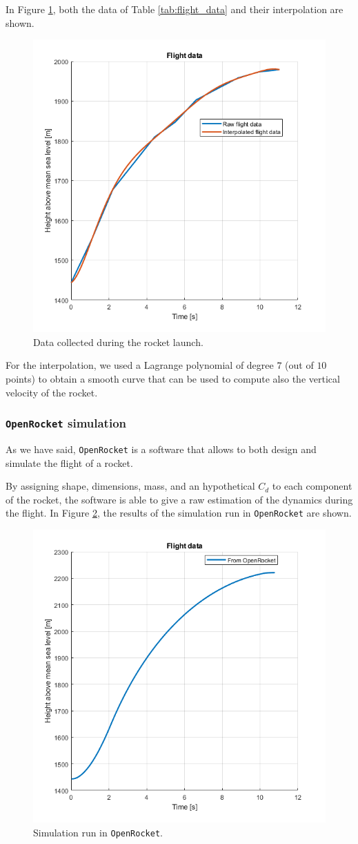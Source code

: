 In Figure \ref{fig:flight_data}, both the data of Table \ref{tab:flight_data} and their interpolation are shown.

\begin{figure}[H]
    \centering
    \includegraphics[width=.5\textwidth]{img/Validation/FlightData.png}
    \caption{Data collected during the rocket launch.}
    \label{fig:flight_data}
\end{figure}

For the interpolation, we used a Lagrange polynomial of degree $7$ (out of $10$ points) to obtain a smooth curve that can be used to compute also the vertical velocity of the rocket.


\subsubsection{\texttt{OpenRocket} simulation}
\label{subsubsec:openrocket_simulation}

As we have said, \texttt{OpenRocket} is a software that allows to both design and simulate the flight of a rocket.

By assigning shape, dimensions, mass, and an hypothetical $C_d$ to each component of the rocket, the software is able to give a raw estimation of the dynamics during the flight.
In Figure \ref{fig:openrocket_simulation}, the results of the simulation run in \texttt{OpenRocket} are shown.

\begin{figure}[H]
    \centering
    \includegraphics[width=.5\textwidth]{img/Validation/OpenRocket.png}
    \caption{Simulation run in \texttt{OpenRocket}.}
    \label{fig:openrocket_simulation}
\end{figure}



